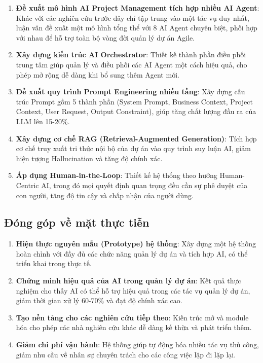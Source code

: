 \documentclass[12pt,a4paper]{report}
\begin{document}
\begin{enumerate}
\item \textbf{Đề xuất mô hình AI Project Management tích hợp nhiều AI Agent}:
Khác với các nghiên cứu trước đây chỉ tập trung vào một tác vụ duy nhất, luận văn đề xuất một mô hình tổng thể với 8 AI Agent chuyên biệt, phối hợp với nhau để hỗ trợ toàn bộ vòng đời quản lý dự án Agile.

\item \textbf{Xây dựng kiến trúc AI Orchestrator}:
Thiết kế thành phần điều phối trung tâm giúp quản lý và điều phối các AI Agent một cách hiệu quả, cho phép mở rộng dễ dàng khi bổ sung thêm Agent mới.

\item \textbf{Đề xuất quy trình Prompt Engineering nhiều tầng}:
Xây dựng cấu trúc Prompt gồm 5 thành phần (System Prompt, Business Context, Project Context, User Request, Output Constraint), giúp tăng chất lượng đầu ra của LLM lên 15-20\%.

\item \textbf{Xây dựng cơ chế RAG (Retrieval-Augmented Generation)}:
Tích hợp cơ chế truy xuất tri thức nội bộ của dự án vào quy trình suy luận AI, giảm hiện tượng Hallucination và tăng độ chính xác.

\item \textbf{Áp dụng Human-in-the-Loop}:
Thiết kế hệ thống theo hướng Human-Centric AI, trong đó mọi quyết định quan trọng đều cần sự phê duyệt của con người, tăng độ tin cậy và chấp nhận của người dùng.
\end{enumerate}

\subsection{Đóng góp về mặt thực tiễn}

\begin{enumerate}
\item \textbf{Hiện thực nguyên mẫu (Prototype) hệ thống}:
Xây dựng một hệ thống hoàn chỉnh với đầy đủ các chức năng quản lý dự án và tích hợp AI, có thể triển khai trong thực tế.

\item \textbf{Chứng minh hiệu quả của AI trong quản lý dự án}:
Kết quả thực nghiệm cho thấy AI có thể hỗ trợ hiệu quả trong các tác vụ quản lý dự án, giảm thời gian xử lý 60-70\% và đạt độ chính xác cao.

\item \textbf{Tạo nền tảng cho các nghiên cứu tiếp theo}:
Kiến trúc mở và module hóa cho phép các nhà nghiên cứu khác dễ dàng kế thừa và phát triển thêm.

\item \textbf{Giảm chi phí vận hành}:
Hệ thống giúp tự động hóa nhiều tác vụ thủ công, giảm nhu cầu về nhân sự chuyên trách cho các công việc lặp đi lặp lại.
\end{enumerate}
\end{document}
